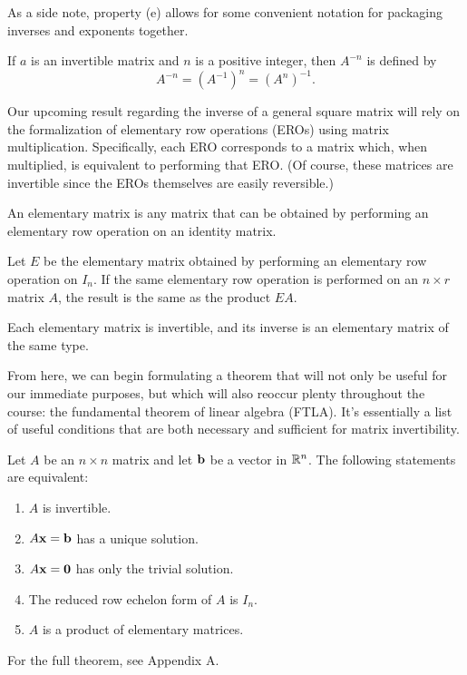 \documentclass[../m073main.tex]{subfiles}
\begin{document}
As a side note, property (e) allows for some convenient notation for packaging inverses and exponents together.

\begin{definition}
	If $a$ is an invertible matrix and $n$ is a positive integer, then $A^{-n}$ is defined by
	\[ A^{-n} = (A^{-1})^n = (A^n)^{-1}. \]
\end{definition}

Our upcoming result regarding the inverse of a general square matrix will rely on the formalization of elementary row operations (EROs) using matrix multiplication.
Specifically, each ERO corresponds to a matrix which, when multiplied, is equivalent to performing that ERO.
(Of course, these matrices are invertible since the EROs themselves are easily reversible.)

\begin{definition}
	An elementary matrix is any matrix that can be obtained by performing an elementary row operation on an identity matrix.
\end{definition}

\begin{theorem}
	Let $E$ be the elementary matrix obtained by performing an elementary row operation on $I_n$.
	If the same elementary row operation is performed on an $n\times r$ matrix $A$, the result is the same as the product $EA$.
\end{theorem}

\begin{theorem}
	Each elementary matrix is invertible, and its inverse is an elementary matrix of the same type.
\end{theorem}

From here, we can begin formulating a theorem that will not only be useful for our immediate purposes, but which will also reoccur plenty throughout the course: the fundamental theorem of linear algebra (FTLA).
It's essentially a list of useful conditions that are both necessary and sufficient for matrix invertibility.

\begin{theorem}
	Let $A$ be an $n\times n$ matrix and let $\mathbf{b}$ be a vector in $\mathbb{R}^n$.
	The following statements are equivalent:
	\begin{multicols}{2}
		\begin{enumerate}[label=(\alph*)]
			\item $A$ is invertible.
			\item $A\mathbf{x}= \mathbf{b}$ has a unique solution.
			\item $A\mathbf{x}=\mathbf{0}$ has only the trivial solution.
			\item The reduced row echelon form of $A$ is $I_n$.
			\item $A$ is a product of elementary matrices.
		\end{enumerate}
	\end{multicols}
	For the full theorem, see Appendix A.
\end{theorem}
\end{document}
